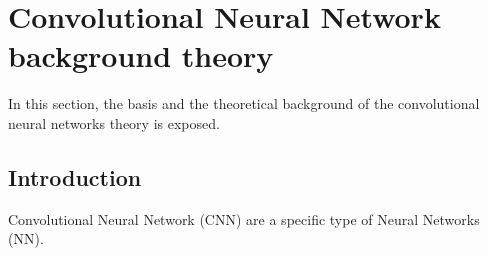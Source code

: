 \section{Convolutional Neural Network background theory}
In this section, the basis and the theoretical background of the convolutional neural networks theory is exposed.\\

\subsection{Introduction}
Convolutional Neural Network (CNN) are a specific type of Neural Networks (NN). \\
